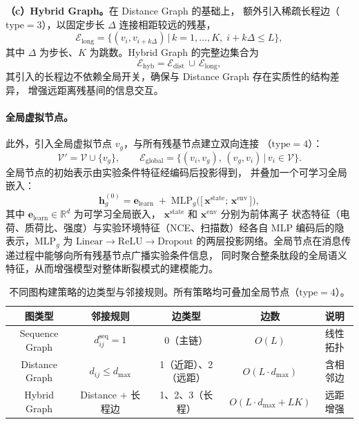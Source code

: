 \textbf{（c）Hybrid Graph。}在 Distance Graph 的基础上，
额外引入稀疏长程边（$\mathrm{type}=3$），以固定步长 $\Delta$ 连接相距较远的残基，
\begin{equation}
\mathcal{E}_{\mathrm{long}} = \big\{ (v_i,v_{i+k\Delta}) \,\big|\, k=1,\ldots,K,\; i+k\Delta \le L \big\},
\end{equation}
其中 $\Delta$ 为步长、$K$ 为跳数。Hybrid Graph 的完整边集合为
\begin{equation}
\mathcal{E}_{\mathrm{hyb}} = \mathcal{E}_{\mathrm{dist}} \,\cup\, \mathcal{E}_{\mathrm{long}},
\end{equation}
其引入的长程边不依赖全局开关，确保与 Distance Graph 存在实质性的结构差异，
增强远距离残基间的信息交互。

\paragraph{全局虚拟节点。}
此外，引入全局虚拟节点 $v_g$，与所有残基节点建立双向连接
（$\mathrm{type}=4$）：
\begin{equation}
\mathcal{V}' = \mathcal{V} \cup \{v_g\},\qquad
\mathcal{E}_{\mathrm{global}} = \big\{ (v_i,v_g),\,(v_g,v_i) \,\big|\, v_i\in\mathcal{V} \big\}.
\end{equation}
全局节点的初始表示由实验条件特征经编码后投影得到，
并叠加一个可学习全局嵌入：
\begin{equation}
\boldsymbol{h}_g^{(0)} = \boldsymbol{e}_{\mathrm{learn}} \;+\;
\mathrm{MLP}_g\!\Big( \big[\,\boldsymbol{x}^{\mathrm{state}};\,\boldsymbol{x}^{\mathrm{env}}\,\big] \Big),
\label{eq:global_node}
\end{equation}
其中 $\boldsymbol{e}_{\mathrm{learn}}\in\mathbb{R}^{d}$ 为可学习全局嵌入，
$\boldsymbol{x}^{\mathrm{state}}$ 和 $\boldsymbol{x}^{\mathrm{env}}$ 分别为前体离子
状态特征（电荷、质荷比、强度）与实验环境特征（NCE、扫描数）经各自 MLP
编码后的隐表示，$\mathrm{MLP}_g$ 为 $\mathrm{Linear}\!\to\!\mathrm{ReLU}\!\to\!\mathrm{Dropout}$
的两层投影网络。全局节点在消息传递过程中能够向所有残基节点广播实验条件信息，
同时聚合整条肽段的全局语义特征，从而增强模型对整体断裂模式的建模能力。

\begin{table}[htbp]
\centering
\caption{不同图构建策略的边类型与邻接规则。所有策略均可叠加全局节点（$\mathrm{type}=4$）。}
\label{tab:graph_types}
\begin{tabular}{c|c|c|c|c}
\hline
图类型 & 邻接规则 & 边类型 & 边数 & 说明 \\
\hline
Sequence Graph & $d_{ij}^{\mathrm{seq}}=1$ & 0（主链） & $O(L)$ & 线性拓扑 \\
Distance Graph & $d_{ij}\le d_{\max}$ & 1（近距）、2（远距） & $O(L\cdot d_{\max})$ & 含相邻边 \\
Hybrid Graph & Distance $+$ 长程边 & 1、2、3（长程） & $O(L\cdot d_{\max}+LK)$ & 远距增强 \\
\hline
\end{tabular}
\end{table}


